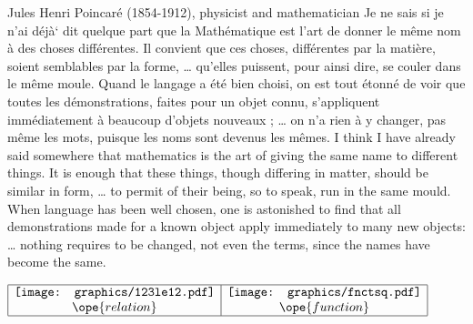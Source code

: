 \qboxnqt
  {
    Jules Henri Poincar\'e (1854-1912), physicist and mathematician
    \footnotemark
  }
  {Je ne sais si je n'ai d\'ej\`a` dit quelque part que la Math\'ematique est 
  l'art de donner le m\^eme nom \`a des choses diff\'erentes. 
  Il convient que ces choses, diff\'erentes par la mati\`ere, 
  soient semblables par la forme, 
  \ldots
  qu'elles puissent, 
  pour ainsi dire, se couler dans le m\^eme moule. 
  Quand le langage a \'et\'e bien choisi, 
  on est tout \'etonn\'e 
  de voir que toutes les d\'emonstrations, faites pour un objet connu, 
  s'appliquent imm\'ediatement \`a beaucoup d'objets nouveaux ; 
  \ldots
  on n'a rien \`a y changer, pas m\^eme les mots, puisque les noms sont devenus les m\^emes.
  }
  {I think I have already said somewhere that mathematics is the art
   of giving the same name to different things. 
   It is enough that these things, though differing in matter, 
   should be similar in form, 
   \ldots
   to permit of their being, so to speak,
   run in the same mould.
   When language has been well chosen, 
   one is astonished to find that all
   demonstrations made for a known object apply immediately to many new objects:
   \ldots
   nothing requires to be changed, 
   not even the terms,
   since the names have become the same.
   }




$\begin{array}{|c|c|}
   \hline
   \texttt{[image: graphics/123le12.pdf]}
  &\texttt{[image: graphics/fnctsq.pdf]}
  \\\ope{relation}&\ope{function}
  \\\hline
\end{array}$




